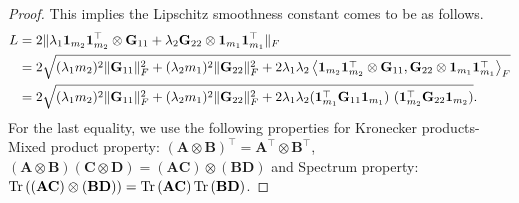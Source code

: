 \begin{proof}
This implies the Lipschitz smoothness constant comes to be as follows.
\begin{equation*}
\begin{split}
L &= 2\|\lambda_1\mathbf{1}_{m_2}\mathbf{1}_{m_2}^\top \otimes \mathbf{G}_{11} +\lambda_2\mathbf{G}_{22} \otimes \mathbf{1}_{m_1}\mathbf{1}_{m_1}^\top\|_F\\ &= 2 \sqrt{(\lambda_1m_2)^2\|\mathbf{G}_{11}\|_F^2+(\lambda_2m_1)^2\|\mathbf{G}_{22}\|_F^2 + 2\lambda_1\lambda_2\left<\mathbf{1}_{m_2}\mathbf{1}_{m_2}^\top \otimes \mathbf{G}_{11}, \mathbf{G}_{22}\otimes\mathbf{1}_{m_1}\mathbf{1}_{m_1}^\top\right>_F}\\
& =  2 \sqrt{(\lambda_1m_2)^2\|\mathbf{G}_{11}\|_F^2+(\lambda_2m_1)^2\|\mathbf{G}_{22}\|_F^2 + 2\lambda_1\lambda_2(\mathbf{1}_{m_1}^\top \mathbf{G}_{11}\mathbf{1}_{m_1})~(\mathbf{1}_{m_2}^\top \mathbf{G}_{22}\mathbf{1}_{m_2})}.
\end{split}
\end{equation*}
For the last equality, we use the following properties for Kronecker products- \newline Mixed product property: $\left(\mathbf{A}\otimes \mathbf{B}\right)^\top = \mathbf{A}^\top\otimes \mathbf{B}^\top$, $(\mathbf{A}\otimes \mathbf{B})(\mathbf{C}\otimes \mathbf{D})=(\mathbf{A}\mathbf{C})\otimes(\mathbf{B}\mathbf{D})$ and Spectrum property: $\textup{Tr}\left((\mathbf{A}\mathbf{C})\otimes(\mathbf{B}\mathbf{D})\right)=\textup{Tr}\left(\mathbf{A}\mathbf{C}\right)\textup{Tr}\left(\mathbf{B}\mathbf{D}\right)$.
\end{proof}


